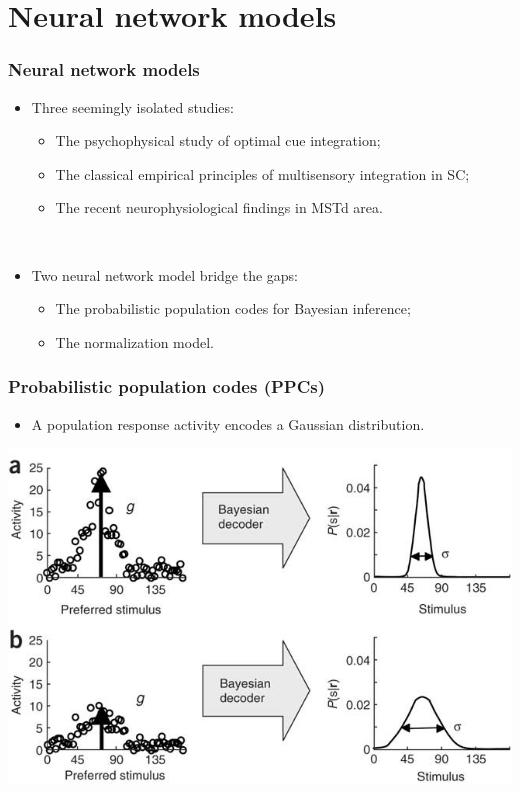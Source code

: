 \documentclass{beamer}
\begin{document}
\section{Neural network models}

\begin{frame}
  \frametitle{Neural network models}
  \begin{itemize}
    \item Three seemingly isolated studies:
    \begin{itemize}
      \item The psychophysical study of optimal cue integration;
      \item The classical empirical principles of multisensory integration in SC;
      \item The recent neurophysiological findings in MSTd area.
    \end{itemize}

    ~
    \item Two neural network model bridge the gaps:
    \begin{itemize}
      \item The probabilistic population codes for Bayesian inference;
      \item The normalization model.
    \end{itemize}
  \end{itemize}
\end{frame}

\begin{frame}
  \frametitle{Probabilistic population codes (PPCs)}
  \begin{itemize}
    \item A population response activity encodes a Gaussian distribution.
  \end{itemize}
  \begin{center}
    \includegraphics[width=.8\textwidth]{decoder}
  \end{center}
\end{frame}
\end{document}
